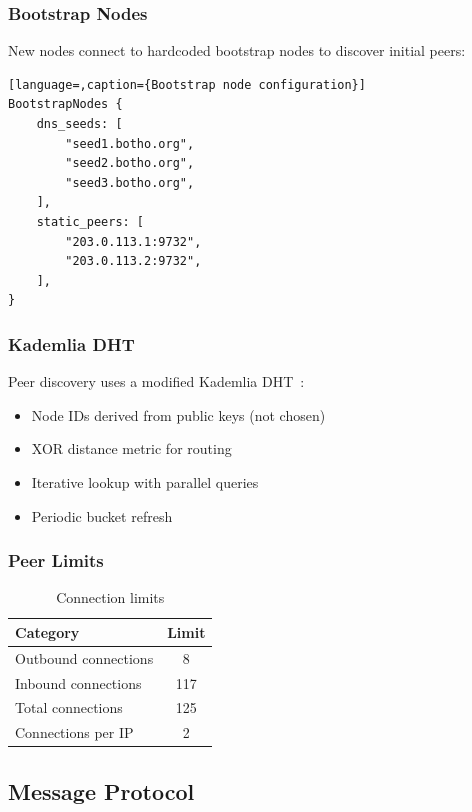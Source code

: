 \subsubsection{Bootstrap Nodes}

New nodes connect to hardcoded bootstrap nodes to discover initial peers:

\begin{lstlisting}[language=,caption={Bootstrap node configuration}]
BootstrapNodes {
    dns_seeds: [
        "seed1.botho.org",
        "seed2.botho.org",
        "seed3.botho.org",
    ],
    static_peers: [
        "203.0.113.1:9732",
        "203.0.113.2:9732",
    ],
}
\end{lstlisting}

\subsubsection{Kademlia DHT}

Peer discovery uses a modified Kademlia DHT~\cite{kademlia}:

\begin{itemize}
  \item Node IDs derived from public keys (not chosen)
  \item XOR distance metric for routing
  \item Iterative lookup with parallel queries
  \item Periodic bucket refresh
\end{itemize}

\subsubsection{Peer Limits}

\begin{table}[h]
\centering
\caption{Connection limits}
\label{tab:peer-limits}
\begin{tabular}{@{}lc@{}}
\toprule
\textbf{Category} & \textbf{Limit} \\
\midrule
Outbound connections & 8 \\
Inbound connections & 117 \\
Total connections & 125 \\
Connections per IP & 2 \\
\bottomrule
\end{tabular}
\end{table}

\subsection{Message Protocol}

